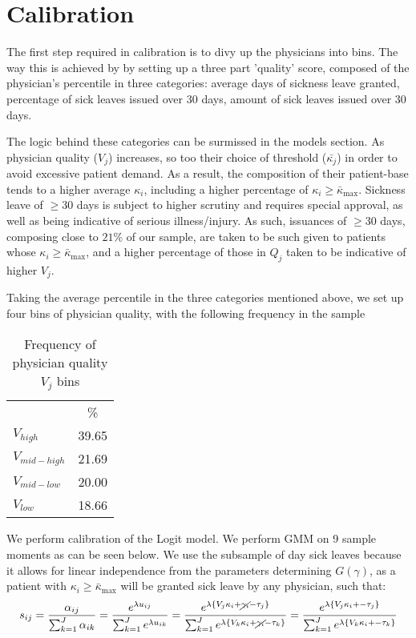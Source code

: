 \documentclass[11pt]{article}
\begin{document}
\section{Calibration}

The first step required in calibration is to divy up the physicians into bins. The way this is achieved by by setting up a three part 'quality' score, composed of the physician's percentile in three categories: average days of sickness leave granted, percentage of sick leaves issued over 30 days, amount of sick leaves issued over 30 days.

The logic behind these categories can be surmissed in the models section. As physician quality ($V_j$) increases, so too their choice of threshold ($\bar{\kappa_j}$) in order to avoid excessive patient demand. As a result, the composition of their patient-base tends to a higher average $\kappa_i$, including a higher percentage of $\kappa_i \geq \bar{\kappa}_{\max}$. Sickness leave of $\geq 30$ days is subject to higher scrutiny and requires special approval, as well as being indicative of serious illness/injury. As such, issuances of $\geq 30$ days, composing close to $21\%$ of our sample, are taken to be such given to patients whose $\kappa_i \geq \bar{\kappa}_{\max}$, and a higher percentage of those in $Q_j$ taken to be indicative of higher $V_j$.

Taking the average percentile in the three categories mentioned above, we set up four bins of physician quality, with the following frequency in the sample

\begin{table}[H]
\centering
\begin{tabular}{lc}
\toprule
 & \% \\
    $V_{high}$  &   39.65 \\
    $V_{mid-high}$ & 21.69 \\
    $V_{mid-low}$ & 20.00 \\
    $V_{low}$   & 18.66 \\
\bottomrule 
\end{tabular}
\caption{Frequency of physician quality $V_j$ bins}
\end{table}

We perform calibration of the Logit model. We perform GMM on 9 sample moments as can be seen below. We use the subsample of day sick leaves because it allows for linear independence from the parameters determining $G(\gamma)$, as a patient with $\kappa_i \geq \bar{\kappa}_{\max}$ will be granted sick leave by any physician, such that:
\[
    s_{ij} = \frac{\alpha_{ij}}{\sum_{k = 1}^{J} \alpha_{ik}} =
    \frac{e^{\lambda u_{ij}}}{\sum_{k = 1}^{J} e^{\lambda u_{ik}}} =
    \frac{e^{\lambda \{V_j \kappa_i + \cancel{\gamma_i} - \tau_j \}}}{\sum_{k = 1}^{J} e^{\lambda \{V_k \kappa_i + \cancel{\gamma_i} - \tau_k \}}} =
    \frac{e^{\lambda \{V_j \kappa_i + - \tau_j \}}}{\sum_{k = 1}^{J} e^{\lambda \{V_k \kappa_i + - \tau_k \}}}
\]
\end{document}
